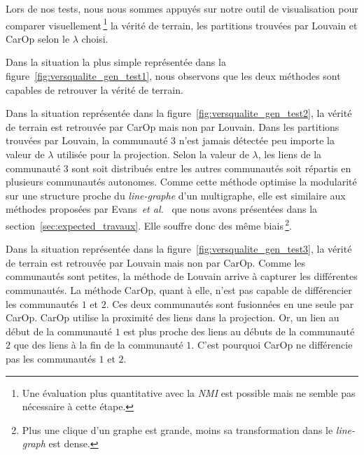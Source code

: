 Lors de nos tests,  nous nous sommes appuyés sur notre outil de visualisation pour comparer visuellement\,\footnote{Une évaluation plus quantitative avec la \emph{NMI} est possible mais ne semble pas nécessaire à cette étape.} la vérité de terrain, les partitions trouvées par Louvain et CarOp selon le $\lambda$ choisi.

\bigskip

Dans la situation la plus simple représentée dans la figure~\ref{fig:versqualite_gen_test1}, nous observons que les deux méthodes sont capables de retrouver la vérité de terrain.

Dans la situation représentée dans la figure~\ref{fig:versqualite_gen_test2}, la vérité de terrain est retrouvée par CarOp mais non par Louvain.
Dans les partitions trouvées par Louvain, la communauté $3$ n'est jamais détectée peu importe la valeur de $\lambda$ utilisée pour la projection.
Selon la valeur de $\lambda$, les liens de la communauté $3$ sont soit distribués entre les autres communautés soit répartis en plusieurs communautés autonomes.
Comme cette méthode optimise la modularité sur une structure proche du \emph{line-graphe} d'un multigraphe, elle est similaire aux méthodes proposées par Evans~\emph{et al.}~\cite{Evans2009} que nous avons présentées dans la section~\ref{sec:expected_travaux}.
Elle souffre donc des même biais\,\footnote{Plus une clique d'un graphe est grande, moins sa transformation dans le \emph{line-graph} est dense.}.

Dans la situation représentée dans la figure~\ref{fig:versqualite_gen_test3}, la vérité de terrain est retrouvée par Louvain mais non par CarOp.
Comme les communautés sont petites, la méthode de Louvain arrive à capturer les différentes communautés.
La méthode CarOp, quant à elle, n'est pas capable de différencier les communautés $1$ et $2$.
Ces deux communautés sont fusionnées en une seule par CarOp.
CarOp utilise la proximité des liens dans la projection.
Or, un lien au début de la communauté $1$ est plus proche des liens au débuts de la communauté $2$ que des liens à la fin de la communauté $1$.
C'est pourquoi CarOp ne différencie pas les communautés $1$ et $2$.




